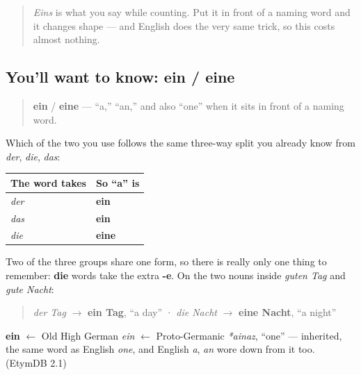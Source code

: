\label{lesson:GE-C06-ein-eine}



\begin{quote}
\emph{Eins} is what you say while counting. Put it in front of a naming word and it changes shape — and English does the very same trick, so this costs almost nothing.
\end{quote}

\subsection*{You'll want to know: ein / eine}
\begin{quote}
\textbf{ein} / \textbf{eine} — \textquotedblleft{}a,\textquotedblright{} \textquotedblleft{}an,\textquotedblright{} and also \textquotedblleft{}one\textquotedblright{} when it sits in front of a naming word.
\end{quote}

Which of the two you use follows the same three-way split you already know from \emph{der}, \emph{die}, \emph{das}:

\noindent
\begin{tabularx}{\linewidth}{@{}>{\raggedright\arraybackslash}X>{\raggedright\arraybackslash}X@{}}
\toprule
\textbf{The word takes} & \textbf{So \textquotedblleft{}a\textquotedblright{} is} \\
\midrule
\emph{der} & \textbf{ein} \\
\emph{das} & \textbf{ein} \\
\emph{die} & \textbf{eine} \\
\bottomrule
\end{tabularx}

Two of the three groups share one form, so there is really only one thing to remember: \textbf{die} words take the extra \textbf{-e}. On the two nouns inside \emph{guten Tag} and \emph{gute Nacht}:

\begin{quote}
\emph{der Tag} $\to$ \textbf{ein Tag}, \textquotedblleft{}a day\textquotedblright{} · \emph{die Nacht} $\to$ \textbf{eine Nacht}, \textquotedblleft{}a night\textquotedblright{}
\end{quote}

\begin{cousinweb}
\textbf{ein} $\leftarrow$ Old High German \emph{ein} $\leftarrow$ Proto-Germanic \emph{*ainaz}, \textquotedblleft{}one\textquotedblright{} — inherited, the same word as English \emph{one}, and English \emph{a}, \emph{an} wore down from it too. (EtymDB 2.1)
\end{cousinweb}

